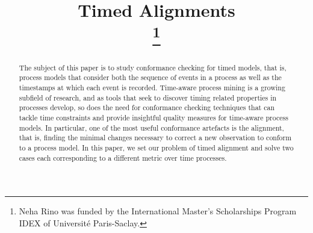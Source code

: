 \documentclass[conference]{IEEEtran}
\newcounter{cases}
\begin{document}
	\title{Timed Alignments\\
		\thanks{Neha Rino was funded by the International Master's Scholarships Program IDEX of Université Paris-Saclay.}
	}
	
	\author{
		
		\and

		\and
	}

	
\maketitle
	
\begin{abstract}
	The subject of this paper is to study conformance checking for timed models, that is, process models that consider both the sequence of events in a process as well as the timestamps at which each event is recorded. 
	Time-aware process mining is a growing subfield of research, and as tools that seek to discover timing related properties in processes develop, so does the need for conformance checking techniques that can tackle time constraints and provide insightful quality measures for time-aware process models. 
	In particular, one of the most useful conformance artefacts is the alignment, that is, finding the minimal changes necessary to correct a new observation to conform to a process model.  
	In this paper, we set our problem of timed alignment and solve two cases each corresponding to a different metric over time processes. %
\end{abstract}
\end{document}
